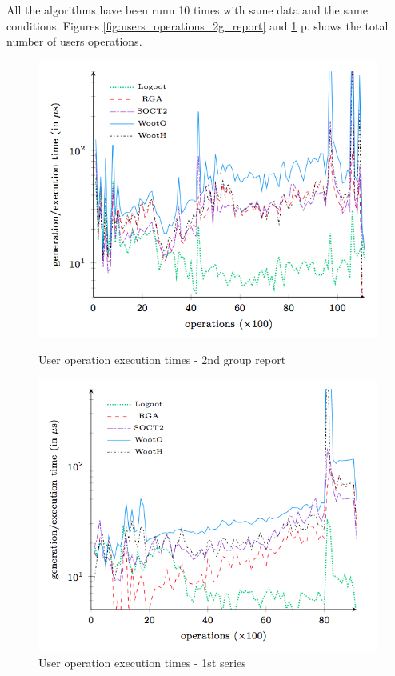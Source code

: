All the algorithms have been runn 10 times with same data and the same conditions. Figures \ref{fig:users_operations_2g_report} and \ref{fig:users_operations_1t_big} p.\pageref{fig:users_operations_2g_report} shows the total number of users operations.\\

\begin{figure}[h!]
\begin{minipage}{0.50\linewidth}
  \includegraphics[width=1.2\textwidth]{includes/users_operations_2g_report.png}
  \caption{User operation execution times - 2nd group
report}
  \label{fig:users_operations_2g_report}
  \end{minipage} \hfill
  \begin{minipage}{.50\linewidth}
    \includegraphics[width=1.2\textwidth]{includes/users_operations_1t_big.png}
  	\caption{User operation execution times - 1st series}
  	\label{fig:users_operations_1t_big}
\end{minipage} \hfill
\end{figure}

